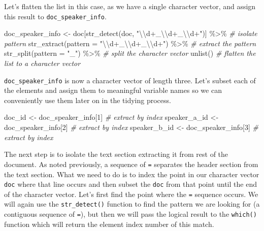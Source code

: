 \documentclass[
]{article}
\newenvironment{Shaded}{\begin{snugshade}}{\end{snugshade}}
\newcommand{\AttributeTok}[1]{\textcolor[rgb]{0.77,0.63,0.00}{#1}}
\newcommand{\CommentTok}[1]{\textcolor[rgb]{0.56,0.35,0.01}{\textit{#1}}}
\newcommand{\DecValTok}[1]{\textcolor[rgb]{0.00,0.00,0.81}{#1}}
\newcommand{\FunctionTok}[1]{\textcolor[rgb]{0.00,0.00,0.00}{#1}}
\newcommand{\NormalTok}[1]{#1}
\newcommand{\OtherTok}[1]{\textcolor[rgb]{0.56,0.35,0.01}{#1}}
\newcommand{\SpecialCharTok}[1]{\textcolor[rgb]{0.00,0.00,0.00}{#1}}
\newcommand{\StringTok}[1]{\textcolor[rgb]{0.31,0.60,0.02}{#1}}
\begin{document}
Let's flatten the list in this case, as we have a single character vector, and assign this result to \texttt{doc\_speaker\_info}.

\begin{Shaded}
\begin{Highlighting}[]
\NormalTok{doc\_speaker\_info }\OtherTok{\textless{}{-}} 
\NormalTok{  doc[}\FunctionTok{str\_detect}\NormalTok{(doc, }\StringTok{"}\SpecialCharTok{\textbackslash{}\textbackslash{}}\StringTok{d+\_}\SpecialCharTok{\textbackslash{}\textbackslash{}}\StringTok{d+\_}\SpecialCharTok{\textbackslash{}\textbackslash{}}\StringTok{d+"}\NormalTok{)] }\SpecialCharTok{\%\textgreater{}\%} \CommentTok{\# isolate pattern}
  \FunctionTok{str\_extract}\NormalTok{(}\AttributeTok{pattern =} \StringTok{"}\SpecialCharTok{\textbackslash{}\textbackslash{}}\StringTok{d+\_}\SpecialCharTok{\textbackslash{}\textbackslash{}}\StringTok{d+\_}\SpecialCharTok{\textbackslash{}\textbackslash{}}\StringTok{d+"}\NormalTok{) }\SpecialCharTok{\%\textgreater{}\%} \CommentTok{\# extract the pattern}
  \FunctionTok{str\_split}\NormalTok{(}\AttributeTok{pattern =} \StringTok{"\_"}\NormalTok{) }\SpecialCharTok{\%\textgreater{}\%}  \CommentTok{\# split the character vector}
  \FunctionTok{unlist}\NormalTok{() }\CommentTok{\# flatten the list to a character vector}
\end{Highlighting}
\end{Shaded}

\texttt{doc\_speaker\_info} is now a character vector of length three. Let's subset each of the elements and assign them to meaningful variable names so we can conveniently use them later on in the tidying process.

\begin{Shaded}
\begin{Highlighting}[]
\NormalTok{doc\_id }\OtherTok{\textless{}{-}}\NormalTok{ doc\_speaker\_info[}\DecValTok{1}\NormalTok{]  }\CommentTok{\# extract by index}
\NormalTok{speaker\_a\_id }\OtherTok{\textless{}{-}}\NormalTok{ doc\_speaker\_info[}\DecValTok{2}\NormalTok{]  }\CommentTok{\# extract by index}
\NormalTok{speaker\_b\_id }\OtherTok{\textless{}{-}}\NormalTok{ doc\_speaker\_info[}\DecValTok{3}\NormalTok{]  }\CommentTok{\# extract by index}
\end{Highlighting}
\end{Shaded}

The next step is to isolate the text section extracting it from rest of the document. As noted previously, a sequence of \texttt{=} separates the header section from the text section. What we need to do is to index the point in our character vector \texttt{doc} where that line occurs and then subset the \texttt{doc} from that point until the end of the character vector. Let's first find the point where the \texttt{=} sequence occurs. We will again use the \texttt{str\_detect()} function to find the pattern we are looking for (a contiguous sequence of \texttt{=}), but then we will pass the logical result to the \texttt{which()} function which will return the element index number of this match.
\end{document}
